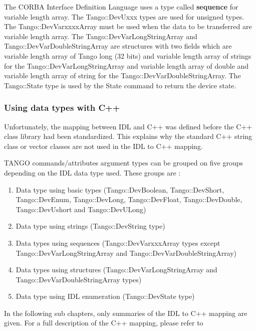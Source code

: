 \vspace{0.3cm}

The CORBA Interface Definition Language uses a type called \textbf{sequence}
for variable length array. The Tango::DevUxxx types are used for unsigned
types. The Tango::DevVarxxxxArray must be used when the data to be
transferred are variable length array. The Tango::DevVarLongStringArray
and Tango::DevVarDoubleStringArray
are structures with two fields which are variable length array of
Tango long (32 bits) and variable length array of strings for the
Tango::DevVarLongStringArray and variable length array of double and
variable length array of string for the Tango::DevVarDoubleStringArray.
The Tango::State type is used by the State
command to return the device state. 

\subsubsection{Using data types with C++}

Unfortunately, the mapping between IDL and C++ was defined before
the C++ class library had been standardized. This explains why the
standard C++ string class or vector classes are not used in the IDL
to C++ mapping.

TANGO commands/attributes argument types can be grouped on five groups
depending on the IDL data type used. These groups are :
\begin{enumerate}
\item Data type using basic types (Tango::DevBoolean, Tango::DevShort, Tango::DevEnum,
Tango::DevLong, Tango::DevFloat, Tango::DevDouble, Tango::DevUshort
and Tango::DevULong)
\item Data type using strings (Tango::DevString type)
\item Data types using sequences (Tango::DevVarxxxArray
types except Tango::DevVarLongStringArray and Tango::DevVarDoubleStringArray)
\item Data types using structures (Tango::DevVarLongStringArray and Tango::DevVarDoubleStringArray
types)
\item Data type using IDL enumeration (Tango::DevState type)
\end{enumerate}
In the following sub chapters, only summaries of the IDL to C++ mapping
are given. For a full description of the C++ mapping, please refer
to \cite{Henning}

